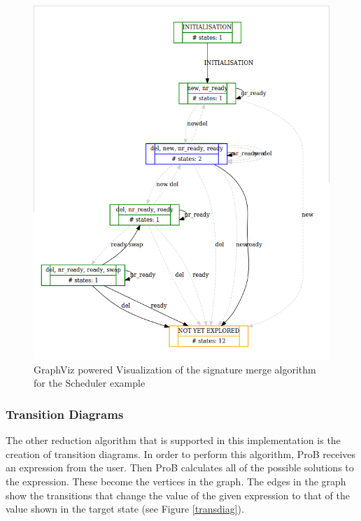 \begin{center}
\begin{figure}[h!]
\centering
\includegraphics[width=14cm]{bilder/dotty-sigmerge.png}
\caption{GraphViz powered Visualization of the signature merge algorithm for the Scheduler example}
\label{sigmergeDotty}
\end{figure}
\end{center}

\subsubsection{Transition Diagrams}

The other reduction algorithm that is supported in this implementation is the creation of transition diagrams. In order to perform this algorithm, ProB receives an expression from the user. Then ProB calculates all of the possible solutions to the expression. These become the vertices in the graph. The edges in the graph show the transitions that change the value of the given expression to that of the value shown in the target state (see Figure \ref{transdiag}).

